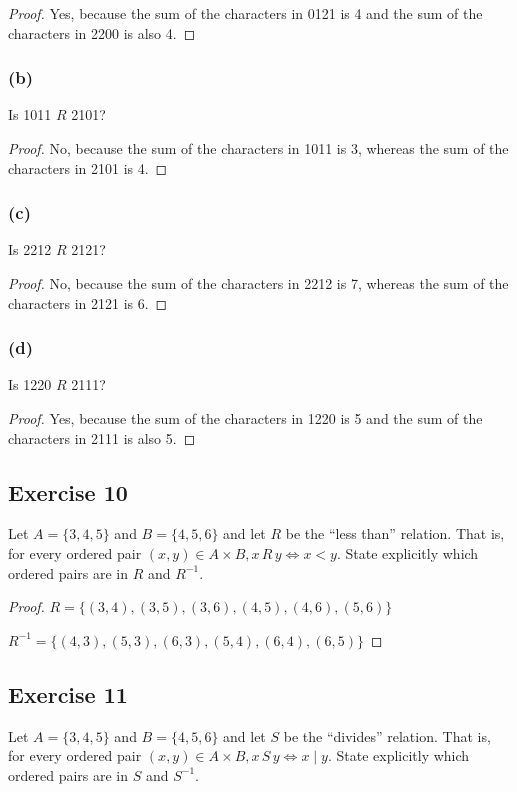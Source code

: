 \documentclass[14pt]{extarticle}
\begin{document}
\begin{proof}
Yes, because the sum of the characters in 0121 is 4 and the sum of the characters in 2200 is also 4.
\end{proof}

\subsubsection{(b)}
Is 1011 $R$ 2101?

\begin{proof}
No, because the sum of the characters in 1011 is 3, whereas the sum of the characters in 2101 is 4.
\end{proof}

\subsubsection{(c)}
Is 2212 $R$ 2121?

\begin{proof}
No, because the sum of the characters in 2212 is 7, whereas the sum of the characters in 2121 is 6.
\end{proof}

\subsubsection{(d)}
Is 1220 $R$ 2111?

\begin{proof}
Yes, because the sum of the characters in 1220 is 5 and the sum of the characters in 2111 is also 5.
\end{proof}

\subsection{Exercise 10}
Let \(A = \{3, 4, 5\}\) and \(B = \{4, 5, 6\}\) and let $R$ be the “less than” relation. That is, for every ordered 
pair \((x, y) \in A \times B, x \, R \, y \iff x < y\). State explicitly which ordered pairs are in $R$ and $R^{-1}$.

\begin{proof}
\(R = \{(3, 4), (3, 5), (3, 6), (4, 5), (4, 6), (5, 6)\}\)

\(R^{-1} = \{(4, 3), (5, 3), (6, 3), (5, 4), (6, 4), (6, 5)\}\)
\end{proof}

\subsection{Exercise 11}
Let \(A = \{3, 4, 5\}\) and \(B = \{4, 5, 6\}\) and let $S$ be the “divides” relation. That is, for every ordered pair 
\((x, y) \in A \times B, x \, S \, y \iff x \mid y\). State explicitly which ordered pairs are in $S$ and $S^{-1}$.
\end{document}
